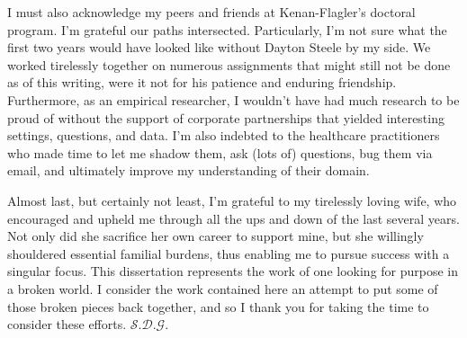I must also acknowledge my peers and friends at Kenan-Flagler’s doctoral program. I’m grateful our paths intersected. Particularly, I’m not sure what the first two years would have looked like without Dayton Steele by my side. We worked tirelessly together on numerous assignments that might still not be done as of this writing, were it not for his patience and enduring friendship. Furthermore, as an empirical researcher, I wouldn’t have had much research to be proud of without the support of corporate partnerships that yielded interesting settings, questions, and data. I’m also indebted to the healthcare practitioners who made time to let me shadow them, ask (lots of) questions, bug them via email, and ultimately improve my understanding of their domain.

Almost last, but certainly not least, I’m grateful to my tirelessly loving wife, who encouraged and upheld me through all the ups and down of the last several years. Not only did she sacrifice her own career to support mine, but she willingly shouldered essential familial burdens, thus enabling me to pursue success with a singular focus.
This dissertation represents the work of one looking for purpose in a broken world. I consider the work contained here an attempt to put some of those broken pieces back together, and so I thank you for taking the time to consider these efforts. $\mathcal{S.D.G.}$


\clearpage
